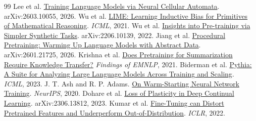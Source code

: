 \documentclass[11pt]{article}
\begin{document}
\begin{thebibliography}{99}
 Lee et al. \href{https://arxiv.org/abs/2603.10055}{Training Language Models via Neural Cellular Automata}. arXiv:2603.10055, 2026.
 Wu et al. \href{https://proceedings.mlr.press/v139/wu21c.html}{LIME: Learning Inductive Bias for Primitives of Mathematical Reasoning}. \textit{ICML}, 2021.
 Wu et al. \href{https://arxiv.org/abs/2206.10139}{Insights into Pre-training via Simpler Synthetic Tasks}. arXiv:2206.10139, 2022.
 Jiang et al. \href{https://arxiv.org/abs/2601.21725}{Procedural Pretraining: Warming Up Language Models with Abstract Data}. arXiv:2601.21725, 2026.
 Krishna et al. \href{https://aclanthology.org/2021.findings-emnlp.273/}{Does Pretraining for Summarization Require Knowledge Transfer?} \textit{Findings of EMNLP}, 2021.
 Biderman et al. \href{https://arxiv.org/abs/2304.01373}{Pythia: A Suite for Analyzing Large Language Models Across Training and Scaling}. \textit{ICML}, 2023.
 J. T. Ash and R. P. Adams. \href{https://arxiv.org/abs/1910.08475}{On Warm-Starting Neural Network Training}. \textit{NeurIPS}, 2020.
 Dohare et al. \href{https://arxiv.org/abs/2306.13812}{Loss of Plasticity in Deep Continual Learning}. arXiv:2306.13812, 2023.
 Kumar et al. \href{https://arxiv.org/abs/2202.10054}{Fine-Tuning can Distort Pretrained Features and Underperform Out-of-Distribution}. \textit{ICLR}, 2022.
\end{thebibliography}
\end{document}
